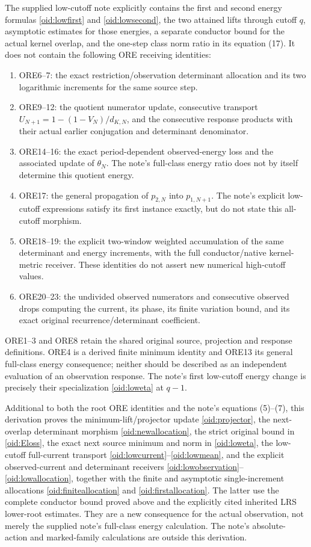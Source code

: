 \documentclass[11pt,a4paper]{article}
\begin{document}
The supplied low-cutoff note explicitly contains the first and second
energy formulas \eqref{oid:lowfirst} and \eqref{oid:lowsecond}, the
two attained lifts through cutoff $q$, asymptotic estimates for those
energies, a separate conductor bound for the actual kernel overlap,
and the one-step class norm ratio in its equation (17). It does not
contain the following ORE receiving identities:
\begin{enumerate}
\item ORE6--7: the exact restriction/observation determinant allocation
and its two logarithmic increments for the same source step.
\item ORE9--12: the quotient numerator update, consecutive transport
$U_{N+1}=1-(1-V_N)/d_{K,N}$, and the consecutive response products
with their actual earlier conjugation and determinant denominator.
\item ORE14--16: the exact period-dependent observed-energy loss and
the associated update of $\theta_N$. The note's full-class energy
ratio does not by itself determine this quotient energy.
\item ORE17: the general propagation of $p_{2,N}$ into $p_{1,N+1}$.
The note's explicit low-cutoff expressions satisfy its first instance
exactly, but do not state this all-cutoff morphism.
\item ORE18--19: the explicit two-window weighted accumulation of the
same determinant and energy increments, with the full conductor/native
kernel-metric receiver. These identities do not assert new numerical
high-cutoff values.
\item ORE20--23: the undivided observed numerators and consecutive
observed drops computing the current, its phase, its finite variation
bound, and its exact original recurrence/determinant coefficient.
\end{enumerate}
ORE1--3 and ORE8 retain the shared original source, projection and
response definitions. ORE4 is a derived finite minimum identity and
ORE13 its general full-class energy consequence; neither should be
described as an independent evaluation of an observation response.
The note's first low-cutoff energy change is precisely their
specialization \eqref{oid:loweta} at $q-1$.

Additional to both the root ORE identities and the note's equations
(5)--(7), this derivation proves the minimum-lift/projector update
\eqref{oid:projector}, the next-overlap determinant morphism
\eqref{oid:newallocation}, the strict original bound in
\eqref{oid:Eloss}, the exact next source minimum and norm in
\eqref{oid:loweta}, the low-cutoff full-current transport
\eqref{oid:lowcurrent}--\eqref{oid:lowmean}, and the explicit
observed-current and determinant receivers
\eqref{oid:lowobservation}--\eqref{oid:lowallocation}, together with
the finite and asymptotic single-increment allocations
\eqref{oid:finiteallocation} and \eqref{oid:firstallocation}.
The latter use the complete conductor bound proved above and the
explicitly cited inherited LRS lower-root estimates. They are a new
consequence for the actual observation, not merely the supplied
note's full-class energy calculation. The note's absolute-action
and marked-family calculations are outside this derivation.
\end{document}
